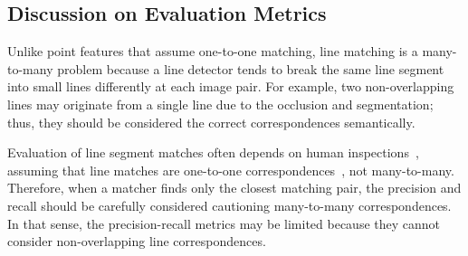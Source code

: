 \documentclass[letterpaper, 10 pt, journal, twoside]{ieeetran}
\begin{document}
\begin{table}[!t]
\caption{Ablation of Line-Transformers.}
\label{tab:ablation}
\centering
{}
\vspace{-5mm}
\end{table}




\subsection{Discussion on Evaluation Metrics}
\label{sec:disc}

Unlike point features that assume one-to-one matching, line matching is a many-to-many problem because a line detector tends to break the same line segment into small lines differently at each image pair. For example, two non-overlapping lines may originate from a single line due to the occlusion and segmentation; thus, they should be considered the correct correspondences semantically. 

Evaluation of line segment matches often depends on human inspections~\cite{Li2016benchmark, WLD2020, DLD2019, LBD2013}, assuming that line matches are one-to-one correspondences~\cite{LBD2013}, not many-to-many. Therefore, when a matcher finds only the closest matching pair, the precision and recall should be carefully considered cautioning many-to-many correspondences. In that sense, the precision-recall metrics may be limited because they cannot consider non-overlapping line correspondences.
\end{document}
